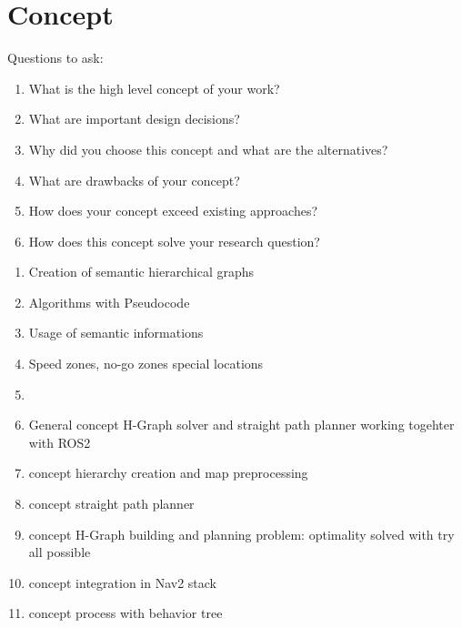 \chapter{Concept}
\label{sec:concept}
Questions to ask:
\begin{enumerate}
    \item What is the high level concept of your work?
    \item What are important design decisions?
    \item Why did you choose this concept and what are the alternatives?
    \item What are drawbacks of your concept?
    \item How does your concept exceed existing approaches?
    \item How does this concept solve your research question?
\end{enumerate}

\begin{enumerate}
    \item Creation of semantic hierarchical graphs
    \item Algorithms with Pseudocode
    \item Usage of semantic informations
    \item Speed zones, no-go zones special locations
    \item 
    \item General concept H-Graph solver and straight path planner working togehter with ROS2
    \item concept hierarchy creation and map preprocessing
    \item concept straight path planner
    \item concept H-Graph building and planning problem: optimality solved with try all possible
    \item concept integration in Nav2 stack
    \item concept process with behavior tree
\end{enumerate}

